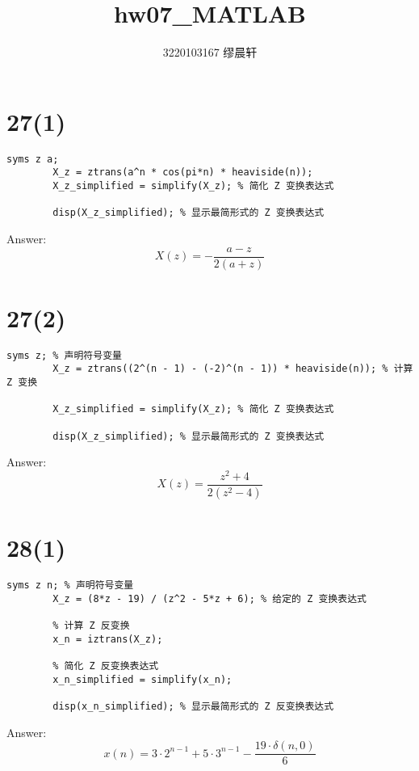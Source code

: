 \documentclass{article}
\title{hw07\_MATLAB}
\author{3220103167 缪晨轩}
\date{\zhdate{2024/5/6}}
\begin{document}
    \maketitle
    \section*{27(1)}
    \begin{lstlisting}[caption={题27(1) MATLAB代码}, label={lst:matlab}]
        syms z a;
        X_z = ztrans(a^n * cos(pi*n) * heaviside(n));
        X_z_simplified = simplify(X_z); % 简化 Z 变换表达式

        disp(X_z_simplified); % 显示最简形式的 Z 变换表达式

    \end{lstlisting}
    Answer: 
    \[X\left( z \right) =  - \frac{{a - z}}{{2\left( {a + z} \right)}}\]
    \section*{27(2)}
    \begin{lstlisting}[caption={题27(2) MATLAB代码}, label={lst:matlab}]
        syms z; % 声明符号变量
        X_z = ztrans((2^(n - 1) - (-2)^(n - 1)) * heaviside(n)); % 计算 Z 变换

        X_z_simplified = simplify(X_z); % 简化 Z 变换表达式

        disp(X_z_simplified); % 显示最简形式的 Z 变换表达式

    \end{lstlisting}
    Answer: 
    \[X\left( z \right) = \frac{{{z^2} + 4}}{{2\left( {{z^2} - 4} \right)}}\]
    \section*{28(1)}
    \begin{lstlisting}[caption={题27(2) MATLAB代码}, label={lst:matlab}]
        syms z n; % 声明符号变量
        X_z = (8*z - 19) / (z^2 - 5*z + 6); % 给定的 Z 变换表达式

        % 计算 Z 反变换
        x_n = iztrans(X_z);

        % 简化 Z 反变换表达式
        x_n_simplified = simplify(x_n);

        disp(x_n_simplified); % 显示最简形式的 Z 反变换表达式

    \end{lstlisting}
    Answer:
    \[x\left( n \right) = 3 \cdot {2^{n - 1}} + 5 \cdot {3^{n - 1}} - \frac{{19 \cdot \delta \left( {n,0} \right)}}{6}\]
\end{document}
